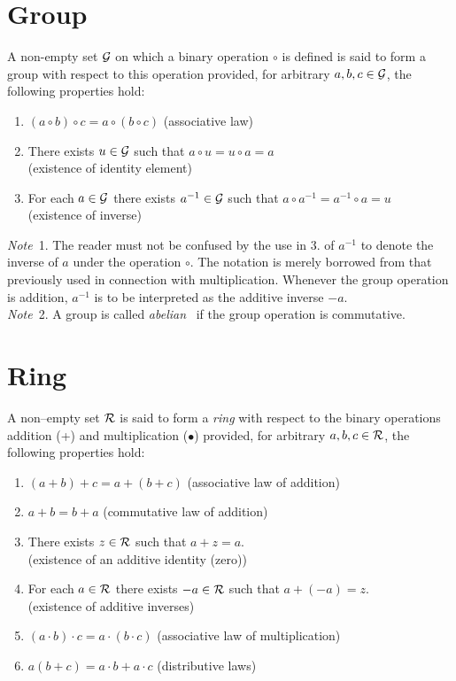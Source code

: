 \documentclass[a4paper,11pt]{article} %
\theoremstyle{plain} %
{\theorembodyfont{\normalfont}
\newtheorem{Exa}{Example}}
\begin{document}
\appendix

\section{Group}
A non-empty set $\cal G$ on which a binary operation $\circ$ is
defined is said to form a group with respect to this operation
provided, for arbitrary $a,b,c \in \cal G$, the following
properties hold: \cite[p.82]{algebra1}
\begin{enumerate}
 \item $(a \circ b) \circ c = a \circ (b \circ c)$ \hfill
 (associative law)
 \item There exists $u \in \cal G$ such that $a \circ u = u \circ
 a = a$ \\ \mbox{} \hfill (existence of identity element)
 \item For each $a \in \cal G$ there exists $a^{-1} \in \cal G$
 such that $a \circ a^{-1} = a^{-1} \circ a = u$ \\
 \mbox{} \hfill (existence of inverse)
\end{enumerate}

{\em Note}~1. The reader must not be confused by the use in 3. of
$a^{-1}$ to denote the inverse of $a$ under the operation $\circ$.
The notation is merely borrowed from that previously used in
connection with multiplication. Whenever the group operation is
addition, $a^{-1}$ is to be interpreted as the additive inverse
$-a$.\\

{\em Note}~2. A group is called {\em abelian}~ if the group
operation is commutative.

\section{Ring}
A non--empty set $\cal R$ is said to form a {\em ring} with
respect to the binary operations addition (+) and multiplication
($\bullet$) provided, for arbitrary $a,b,c \in \cal R$, the
following properties hold:  \cite[p.101]{algebra1}
\begin{enumerate}
  \item $(a+b)+c = a+(b+c)$ \hfill (associative law of addition)
  \item $a+b = b+a$ \hfill (commutative law of addition)
  \item There exists $z \in \cal R$ such that $a+z=a$.\\ \mbox{} \hfill
  (existence of an additive identity (zero))
  \item For each $a \in \cal R$ there exists $-a \in \cal R$ such
  that $a+(-a)=z$.\\ \mbox{} \hfill (existence of additive inverses)
  \item $(a \cdot b)\cdot c = a \cdot (b \cdot c)$ \hfill
  (associative law of multiplication)
  \item $a(b+c) = a \cdot b + a \cdot c$ \hfill (distributive
  laws)
\end{enumerate}
\end{document}
